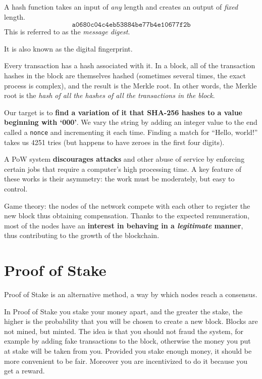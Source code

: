 A hash function takes an input of \textit{any} length and creates an output of \textit{fixed} length.
\begin{equation*}
    \texttt{a0680c04c4eb53884be77b4e10677f2b}
\end{equation*}
This is referred to as the \textit{message digest}.

It is also known as the digital fingerprint.

Every transaction has a hash associated with it. In a block, all of the transaction hashes in the block are themselves hashed (sometimes several times, the exact process is complex), and the result is the Merkle root. In other words, the Merkle root is the \textit{hash of all the hashes of all the transactions in the block}.

Our target is to \textbf{find a variation of it that SHA-256 hashes to a value beginning with `000'}. We vary the string by adding an integer value to the end called a \texttt{nonce} and incrementing it each time. Finding a match for ``Hello, world!'' takes us 4251 tries (but happens to have zeroes in the first four digits).

A PoW system \textbf{discourages attacks} and other abuse of service by enforcing certain jobs that require a computer's high processing time. A key feature of these works is their asymmetry: the work must be moderately, but easy to control.

Game theory: the nodes of the network compete with each other to register the new block thus obtaining compensation. Thanks to the expected remuneration, most of the nodes have an \textbf{interest in behaving in a \emph{legitimate} manner}, thus contributing to the growth of the blockchain.

\section{Proof of Stake}

Proof of Stake is an alternative method, a way by which nodes reach a consensus.


In Proof of Stake you stake your money apart, and the greater the stake, the higher is the probability that you will be chosen to create a new block. Blocks are not mined, but minted. The idea is that you should not fraud the system, for example by adding fake transactions to the block, otherwise the money you put at stake will be taken from you. Provided you stake enough money, it should be more convenient to be fair. Moreover you are incentivized to do it because you get a reward.

